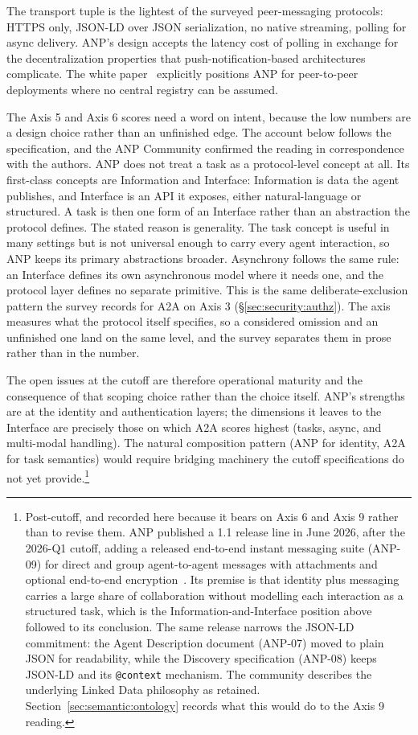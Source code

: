 The transport tuple is the lightest of the surveyed
peer-messaging protocols: HTTPS only, JSON-LD over JSON
serialization, no native streaming, polling for async
delivery. ANP's design accepts the latency cost of polling
in exchange for the decentralization properties that
push-notification-based architectures complicate. The
white paper~\cite{spec_anp} explicitly positions ANP for
peer-to-peer deployments where no central registry can be
assumed.

The Axis 5 and Axis 6 scores need a word on intent,
because the low numbers are a design choice rather than an
unfinished edge. The account below follows the
specification, and the ANP Community confirmed the reading
in correspondence with the authors. ANP does not treat a
task as a
protocol-level concept at all. Its first-class concepts are
Information and Interface: Information is data the agent
publishes, and Interface is an API it exposes, either
natural-language or structured. A task is then one form of
an Interface rather than an abstraction the protocol
defines. The stated reason is generality. The task concept
is useful in many settings but is not universal enough to
carry every agent interaction, so ANP keeps its primary
abstractions broader. Asynchrony follows the same rule: an
Interface defines its own asynchronous model where it needs
one, and the protocol layer defines no separate primitive.
This is the same deliberate-exclusion pattern the survey
records for A2A on Axis 3
(\S\ref{sec:security:authz}). The axis measures what the
protocol itself specifies, so a considered omission and an
unfinished one land on the same level, and the survey
separates them in prose rather than in the number.

The open issues at the cutoff are therefore operational
maturity and the consequence of that scoping choice rather
than the choice itself. ANP's strengths are at the identity
and authentication layers; the dimensions it leaves to the
Interface are precisely those on which A2A scores highest
(tasks, async, and multi-modal handling). The natural
composition pattern (ANP for identity, A2A for task
semantics) would require bridging machinery the cutoff
specifications do not yet provide.\footnote{Post-cutoff, and
recorded here because it bears on Axis 6 and Axis 9 rather
than to revise them. ANP published a 1.1 release line in
June 2026, after the 2026-Q1 cutoff, adding a released
end-to-end instant messaging suite (ANP-09) for direct and
group agent-to-agent messages with attachments and optional
end-to-end encryption~\cite{spec_anp_v11}. Its premise is
that identity plus messaging carries a large share of
collaboration without modelling each interaction as a
structured task, which is the Information-and-Interface
position above followed to its conclusion. The same release
narrows the JSON-LD commitment: the Agent Description
document (ANP-07) moved to plain JSON for readability,
while the Discovery specification (ANP-08) keeps JSON-LD
and its \texttt{@context} mechanism. The community
describes the underlying Linked Data philosophy as
retained. Section~\ref{sec:semantic:ontology} records what
this would do to the Axis 9 reading.}

